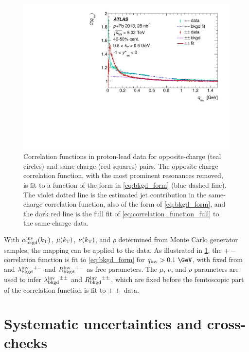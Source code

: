 \begin{figure}[t]
\centering
\includegraphics{cqinv_charge_comp_cent6_kt4_kys1.pdf}
\caption{Correlation functions in proton-lead data for opposite-charge (teal circles) and same-charge (red squares) pairs. The opposite-charge correlation function, with the most prominent resonances removed, is fit to a function of the form in \cref{eq:bkgd_form} (blue dashed line). The violet dotted line is the estimated jet contribution in the same-charge correlation function, also of the form of \cref{eq:bkgd_form}, and the dark red line is the full fit of \cref{eq:correlation_function_full} to the same-charge data.}
\label{fig:hp_example}
\end{figure}

With $\alpha_{\mathrm{bkgd}}^{\mathrm{inv}}(k_\mathrm{T})$, $\mu(k_\mathrm{T})$, $\nu(k_\mathrm{T})$, and $\rho$ determined from Monte Carlo generator samples, the mapping can be applied to the \pPb data.
As illustrated in \cref{fig:hp_example}, the $+-$ correlation function is fit to \cref{eq:bkgd_form} for $\qinv > 0.1~\GeV$, with \abkgd fixed from \PYEight and $\lambda_{\mathrm{bkgd}}^{\mathrm{inv}}{}^{+-}$ and $R_{\mathrm{bkgd}}^{\mathrm{inv}}{}^{+-}$ as free parameters.
The $\mu$, $\nu$, and $\rho$ parameters are used to infer $\lambda_{\mathrm{bkgd}}^{\mathrm{inv}}{}^{\pm\pm}$ and $R_{\mathrm{bkgd}}^{\mathrm{inv}}{}^{\pm\pm}$, which are fixed before the femtoscopic part of the correlation function is fit to $\pm\pm$ data.

\FloatBarrier


\section{Systematic uncertainties and cross-checks}
\label{sec:systematics}

